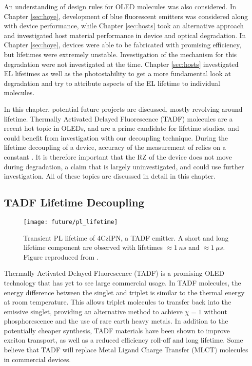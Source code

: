 \documentclass[../thesis.tex]{subfiles}
\begin{document}
An understanding of design rules for OLED molecules was also considered.
In Chapter \ref{sec:hoye}, development of blue fluorescent emitters was considered along with device performance, while Chapter \ref{sec:hosts} took an alternative approach and investigated host material performance in device and optical degradation.
In Chapter \ref{sec:hoye}, devices were able to be fabricated with promising efficiency, but lifetimes were extremely unstable.
Investigation of the mechanism for this degradation were not investigated at the time.
Chapter \ref{sec:hosts} investigated EL lifetimes as well as the photostability to get a more fundamental look at degradation and try to attribute aspects of the EL lifetime to individual molecules.

In this chapter, potential future projects are discussed, mostly revolving around lifetime.
Thermally Activated Delayed Fluorescence (TADF) molecules are a recent hot topic in OLEDs, and are a prime candidate for lifetime studies, and could benefit from investigation with our decoupling technique.
During the lifetime decoupling of a device, accuracy of the measurement of \pl relies on a constant \oc.
It is therefore important that the RZ of the device does not move during degradation, a claim that is largely uninvestigated, and could use further investigation.
All of these topics are discussed in detail in this chapter.

\subsection{TADF Lifetime Decoupling}

\begin{wrapfigure}{r}{.5\textwidth}
\centering
\texttt{[image: future/pl\_lifetime]}
\caption{Transient PL lifetime of 4CzIPN, a TADF emitter.  A short and long lifetime component are observed with lifetimes $\approx 1\ ns$ and $\approx 1\ \mu s$.  Figure reproduced from \textcite{Menke2016}.}
\label{fig:future_pl_lifetime}
\end{wrapfigure}

Thermally Activated Delayed Fluorescence (TADF) is a promising OLED technology that has yet to see large commercial usage.\supercite{Endo2009,Zhang2012b,Uoyama2012,Zhang2012c,Li2013}
In TADF molecules, the energy difference between the singlet and triplet is similar to the thermal energy at room temperature.  
This allows triplet molecules to transfer back into the emissive singlet, providing an alternative method to achieve $\chi=1$ without phosphorescence and the use of rare earth heavy metals.
In addition to the potentially cheaper synthesis, TADF materials have been shown to improve exciton transport,\supercite{Menke2016} as well as a reduced efficiency roll-off\supercite{Inoue2016,Wang2015} and long lifetime.\supercite{Cho2014,Mehes2014}
Some believe that TADF will replace Metal Ligand Charge Transfer (MLCT) molecules in commercial devices.\supercite{Reineke2014a}
\end{document}
